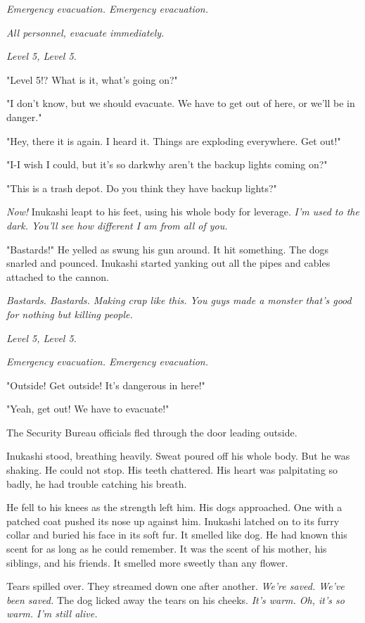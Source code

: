 \emph{Emergency evacuation. Emergency evacuation.}

\emph{All personnel, evacuate immediately.}

\emph{Level 5, Level 5.}

"Level 5!? What is it, what's going on?"

"I don't know, but we should evacuate. We have to get out of here, or
we'll be in danger."

"Hey, there it is again. I heard it. Things are exploding everywhere.
Get out!"

"I-I wish I could, but it's so dark\el why aren't the backup lights
coming on?"

"This is a trash depot. Do you think they have backup lights?"

\emph{Now!} Inukashi leapt to his feet, using his whole body for leverage. \emph{I'm
used to the dark. You'll see how different I am from all of you.}

"Bastards!" He yelled as swung his gun around. It hit something. The
dogs snarled and pounced. Inukashi started yanking out all the pipes and
cables attached to the cannon.

\emph{Bastards. Bastards. Making crap like this. You guys made a monster
that's good for nothing but killing people.}

\emph{Level 5, Level 5.}

\emph{Emergency evacuation. Emergency evacuation.}

"Outside! Get outside! It's dangerous in here!"

"Yeah, get out! We have to evacuate!"

The Security Bureau officials fled through the door leading outside.

Inukashi stood, breathing heavily. Sweat poured off his whole body. But
he was shaking. He could not stop. His teeth chattered. His heart was
palpitating so badly, he had trouble catching his breath.

He fell to his knees as the strength left him. His dogs approached. One
with a patched coat pushed its nose up against him. Inukashi latched on
to its furry collar and buried his face in its soft fur. It smelled like
dog. He had known this scent for as long as he could remember. It was
the scent of his mother, his siblings, and his friends. It smelled more
sweetly than any flower.

Tears spilled over. They streamed down one after another. \emph{We're saved.
We've been saved.} The dog licked away the tears on his cheeks. \emph{It's
warm. Oh, it's so warm. I'm still alive.}

